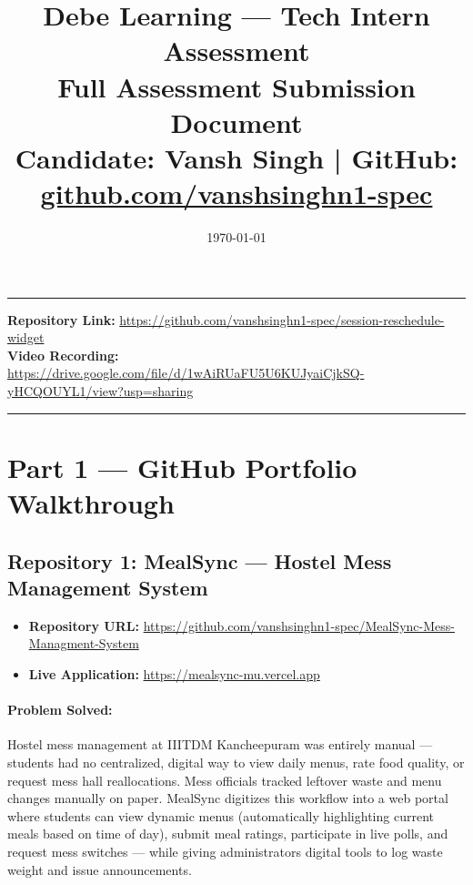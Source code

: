 \documentclass[11pt, a4paper]{article}
\title{
  \vspace{-1.2cm}
  \textbf{Debe Learning --- Tech Intern Assessment} \\[0.3em]
  \large Full Assessment Submission Document \\[0.2em]
  \normalsize Candidate: \textbf{Vansh Singh} \quad | \quad GitHub: \href{https://github.com/vanshsinghn1-spec}{github.com/vanshsinghn1-spec}
}
\author{}
\date{\today}
\begin{document}
\maketitle
\thispagestyle{fancy}

\hrule
\vspace{0.8em}
\noindent \textbf{Repository Link:} \url{https://github.com/vanshsinghn1-spec/session-reschedule-widget} \\
\textbf{Video Recording:} \url{https://drive.google.com/file/d/1wAiRUaFU5U6KUJyaiCjkSQ-yHCQOUYL1/view?usp=sharing}
\vspace{0.8em}
\hrule

\bigskip

\section{Part 1 --- GitHub Portfolio Walkthrough}

\subsection{Repository 1: MealSync --- Hostel Mess Management System}

\begin{itemize}[leftmargin=*]
  \item \textbf{Repository URL:} \url{https://github.com/vanshsinghn1-spec/MealSync-Mess-Managment-System}
  \item \textbf{Live Application:} \url{https://mealsync-mu.vercel.app}
\end{itemize}

\paragraph{Problem Solved:}
Hostel mess management at IIITDM Kancheepuram was entirely manual --- students had no centralized, digital way to view daily menus, rate food quality, or request mess hall reallocations. Mess officials tracked leftover waste and menu changes manually on paper. MealSync digitizes this workflow into a web portal where students can view dynamic menus (automatically highlighting current meals based on time of day), submit meal ratings, participate in live polls, and request mess switches --- while giving administrators digital tools to log waste weight and issue announcements.
\end{document}
